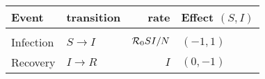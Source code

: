 \documentclass[12pt]{article}
\begin{document}
\begin{center}\begin{tabular}{llrl}
   {\bf Event} & {\bf transition} &{\bf rate} &{\bf Effect $(S,I)$}
   \\ \hline
   \\ Infection &$S \to I$  &${\cal R}_0 SI/N$ & $(-1,1)$
   \\ Recovery & $I \to R$ & $ I$ & $(0,-1)$
\end{tabular}\end{center}
\end{document}
